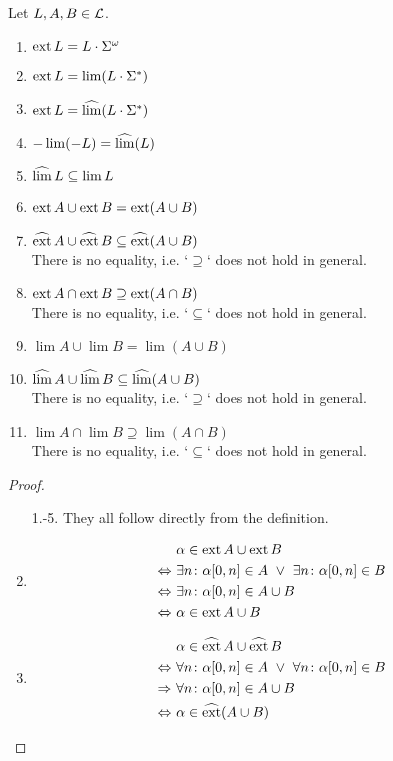\begin{lemma}
\label{gen:general}
Let $L,A,B \in \mathcal{L}$.
\begin{enumerate}
\item $\operatorname{ext} L = L \cdot \Sigma^\omega$
\item $\operatorname{ext} L = \lim(L \cdot \Sigma^*)$ %
\item $\operatorname{ext} L = \operatorname{\widehat{lim}}(L \cdot \Sigma^*)$ %
\item $- \lim(-L) = \operatorname{\widehat{lim}}(L)$
\item $\operatorname{\widehat{lim}} L \subseteq \lim L$
\item $\operatorname{ext} A \cup \operatorname{ext} B = \operatorname{ext}(A \cup B)$
\item $\operatorname{\widehat{ext}} A \cup \operatorname{\widehat{ext}} B \subseteq \operatorname{\widehat{ext}}(A \cup B)$ \\
There is no equality, i.e. `$\supseteq$` does not hold in general.
\item $\operatorname{ext} A \cap \operatorname{ext} B \supseteq \operatorname{ext} (A \cap B)$ \\
There is no equality, i.e. `$\subseteq$` does not hold in general.
\item $\lim A \cup \lim B = \lim(A \cup B)$ %
\item $\operatorname{\widehat{lim}} A \cup \operatorname{\widehat{lim}} B \subseteq \operatorname{\widehat{lim}}(A \cup B)$ \\ %
There is no equality, i.e. `$\supseteq$` does not hold in general.
\item $\lim A \cap \lim B \supseteq \lim(A \cap B)$ \\
There is no equality, i.e. `$\subseteq$` does not hold in general.
\end{enumerate}
\begin{proof}
\begin{enumerate}
\item[1.-5.] They all follow directly from the definition.
\setcounter{enumi}{5}
\item
\begin{align*}
& \alpha \in \ext A \cup \ext B \\
\Leftrightarrow \ & \exists n \colon \alpha[0,n] \in A \ \vee \ \exists n \colon \alpha[0,n] \in B \\
\Leftrightarrow \ & \exists n \colon \alpha[0,n] \in A \cup B \\
\Leftrightarrow \ & \alpha \in \ext A \cup B
\end{align*}
\item
\begin{align*}
& \alpha \in \dext A \cup \dext B \\
\Leftrightarrow \ & \forall n \colon \alpha[0,n] \in A \ \vee \ 
\forall n \colon \alpha[0,n] \in B \\
\Rightarrow \ & \forall n \colon \alpha[0,n] \in A \cup B \\
\Leftrightarrow \ & \alpha \in \dext (A \cup B)
\end{align*}


\end{enumerate}
\end{proof}
\end{lemma}
